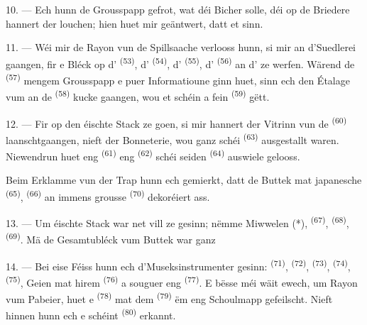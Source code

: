 10. --- Ech hunn de Grousspapp gefrot, wat déi Bicher solle, déi op de Briedere
hannert der  louchen; hien huet mir geäntwert, datt et
 sinn.

\VUsaut{3.6mm}
\VUsaut{2.8mm}

11. --- Wéi mir de Rayon vun de Spillsaache verlooss hunn, si mir an d'Suedlerei
gaangen, fir e Bléck op d' \textsuperscript{(53)},
d' \textsuperscript{(54)}, d' \textsuperscript{(55)},
d' \textsuperscript{(56)} an d' ze werfen. Wärend de
 \textsuperscript{(57)} mengem Grousspapp e puer Informatioune ginn
huet, sinn ech den Étalage vum  an de 
\textsuperscript{(58)} kucke gaangen, wou et schéin  a fein
 \textsuperscript{(59)} gëtt.

12. --- Fir op den éischte Stack ze goen, si mir hannert der Vitrinn vun de
 \textsuperscript{(60)} laanschtgaangen, nieft der Bonneterie, wou
ganz schéi  \textsuperscript{(63)} ausgestallt waren. Niewendrun huet
eng  \textsuperscript{(61)} eng 
\textsuperscript{(62)} schéi seiden  \textsuperscript{(64)} auswiele
gelooss.

Beim Erklamme vun der Trap hunn ech gemierkt, datt de Buttek mat japanesche
 \textsuperscript{(65)},  \textsuperscript{(66)} an
immens grousse  \textsuperscript{(70)} dekoréiert ass.

13. --- Um éischte Stack war net vill ze gesinn; nëmme Miwwelen (*),
 \textsuperscript{(67)},  \textsuperscript{(68)},
 \textsuperscript{(69)}. Mä de Gesamtubléck vum Buttek war ganz

14. --- Bei eise Féiss hunn ech d'Museksinstrumenter gesinn: 
\textsuperscript{(71)},  \textsuperscript{(72)},
 \textsuperscript{(73)}, 
\textsuperscript{(74)},  \textsuperscript{(75)}, Geien mat hirem
 \textsuperscript{(76)} a souguer eng 
\textsuperscript{(77)}. E bësse méi wäit ewech, um Rayon vum Pabeier, huet e
 \textsuperscript{(78)} mat dem 
\textsuperscript{(79)} ëm eng Schoulmapp gefeilscht. Nieft hinnen hunn ech e schéint
 \textsuperscript{(80)} erkannt.

